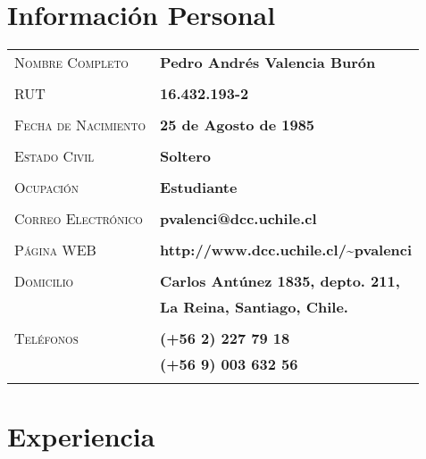 \documentclass[letterpaper, oneside, final, 12pt]{scrartcl}
\newcommand{\gray}{\rowcolor[gray]{.90}}
\begin{document}
\begin{center}
\textsc{\Huge{}}

\section{Informaci\'on Personal}

\begin{tabularx}{0.97\linewidth}{>{\raggedleft\scshape}p{5cm}X}

\gray	Nombre Completo		& \textbf{Pedro Andr\'es Valencia Bur\'on} \\
	& \\
\gray	RUT					& \textbf{16.432.193-2} \\
	& \\
\gray	Fecha de Nacimiento & \textbf{25 de Agosto de 1985} \\	
	& \\
\gray	Estado Civil 		& \textbf{Soltero} \\
	& \\
\gray	Ocupaci\'on 		& \textbf{Estudiante} \\
	& \\
\gray	Correo Electr\'onico	& \textbf{pvalenci@dcc.uchile.cl} \\
	& \\
\gray	Página WEB			& \textbf{http://www.dcc.uchile.cl/\~{}pvalenci} \\
	& \\
\gray	Domicilio			& \textbf{Carlos Ant\'unez 1835, depto. 211,} \\
\gray						& \textbf{La Reina, Santiago, Chile.} \\
	& \\
\gray	Tel\'efonos			& \textbf{(+56 2) 227 79 18} \\
\gray						& \textbf{(+56 9) 003 632 56} \\
	& \\

\end{tabularx}

\section{Experiencia}


\end{center}
\end{document}

